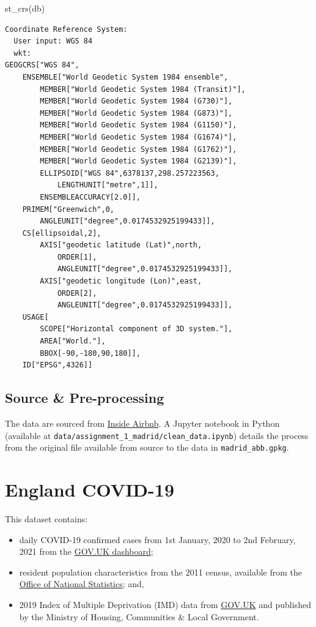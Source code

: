 \documentclass[
  letterpaper,
  DIV=11,
  numbers=noendperiod,
  oneside]{scrreprt}
\newenvironment{Shaded}{\begin{snugshade}}{\end{snugshade}}
\newcommand{\FunctionTok}[1]{\textcolor[rgb]{0.28,0.35,0.67}{#1}}
\newcommand{\NormalTok}[1]{\textcolor[rgb]{0.00,0.23,0.31}{#1}}
\begin{document}
\begin{Shaded}
\begin{Highlighting}[]
\FunctionTok{st\_crs}\NormalTok{(db)}
\end{Highlighting}
\end{Shaded}

\begin{verbatim}
Coordinate Reference System:
  User input: WGS 84 
  wkt:
GEOGCRS["WGS 84",
    ENSEMBLE["World Geodetic System 1984 ensemble",
        MEMBER["World Geodetic System 1984 (Transit)"],
        MEMBER["World Geodetic System 1984 (G730)"],
        MEMBER["World Geodetic System 1984 (G873)"],
        MEMBER["World Geodetic System 1984 (G1150)"],
        MEMBER["World Geodetic System 1984 (G1674)"],
        MEMBER["World Geodetic System 1984 (G1762)"],
        MEMBER["World Geodetic System 1984 (G2139)"],
        ELLIPSOID["WGS 84",6378137,298.257223563,
            LENGTHUNIT["metre",1]],
        ENSEMBLEACCURACY[2.0]],
    PRIMEM["Greenwich",0,
        ANGLEUNIT["degree",0.0174532925199433]],
    CS[ellipsoidal,2],
        AXIS["geodetic latitude (Lat)",north,
            ORDER[1],
            ANGLEUNIT["degree",0.0174532925199433]],
        AXIS["geodetic longitude (Lon)",east,
            ORDER[2],
            ANGLEUNIT["degree",0.0174532925199433]],
    USAGE[
        SCOPE["Horizontal component of 3D system."],
        AREA["World."],
        BBOX[-90,-180,90,180]],
    ID["EPSG",4326]]
\end{verbatim}

\subsection*{Source \& Pre-processing}\label{source-pre-processing}

The data are sourced from \href{http://insideairbnb.com/}{Inside
Airbnb}. A Jupyter notebook in Python (available at
\texttt{data/assignment\_1\_madrid/clean\_data.ipynb}) details the
process from the original file available from source to the data in
\texttt{madrid\_abb.gpkg}.

\section{England COVID-19}\label{england-covid-19}

This dataset contains:

\begin{itemize}
\item
  daily COVID-19 confirmed cases from 1st January, 2020 to 2nd February,
  2021 from the \href{https://coronavirus.data.gov.uk}{GOV.UK
  dashboard};
\item
  resident population characteristics from the 2011 census, available
  from the \href{https://www.nomisweb.co.uk/home/census2001.asp}{Office
  of National Statistics}; and,
\item
  2019 Index of Multiple Deprivation (IMD) data from
  \href{https://www.gov.uk/government/statistics/english-indices-of-deprivation-2019}{GOV.UK}
  and published by the Ministry of Housing, Communities \& Local
  Government.
\end{itemize}
\end{document}
